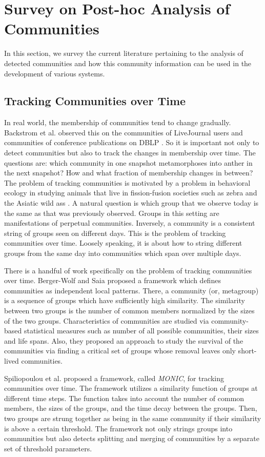 \section{Survey on Post-hoc Analysis of Communities}
In this section, we survey the current literature pertaining to the analysis of detected communities and how this community information can
be used in the development of various systems. 

\subsection{Tracking Communities over Time}
In real world, the membership of communities tend to change gradually. Backstrom et al. observed this on the communities of LiveJournal
users
and communities of conference publications on DBLP \cite{Backstrom:2006}. So it is important not only to detect communities but also to
track the changes in membership over time. The questions are: which community in one snapshot metamorphoses into anther in the next
snapshot? How and what fraction of membership changes in between? The problem of tracking communities is
motivated by a problem in behavioral ecology in studying animals that live in fission-fusion societies such as zebra and the Asiatic wild
ass \cite{citeulike:938243}. A natural question is
which group that we observe today is the same as that was previously observed. Groups in this setting are manifestations of perpetual
communities. Inversely, a community is a consistent string of groups seen on different days. This is the problem of tracking communities
over time. Loosely speaking, it is about how to string different groups from the same day into communities which span over multiple days. 

There is a handful of work specifically on the problem of tracking communities over time. Berger-Wolf and Saia \cite{Berger-Wolf:2006}
proposed a framework which defines communities as independent local patterns. There, a community (or, metagroup) is a sequence of groups
which have sufficiently high similarity. The similarity between two groups is the number of common members normalized by the sizes of the
two groups. Characteristics of communities are studied via community-based statistical measures such as number of all possible communities,
their sizes and life spans. Also, they proposed an approach to study the survival of the communities via finding a critical set of groups
whose removal leaves only short-lived communities.

Spiliopoulou et al. \cite{Spiliopoulou:2006} proposed a framework, called {\em MONIC}, for tracking communities over time. The framework
utilizes a similarity function of groups at different time steps. The function takes into account the number of common members, the sizes of
the groups, and the time decay between the groups. Then, two groups are strung together as being in the same community if their similarity
is above a certain threshold. The framework not only strings groups into communities but also detects splitting and merging of communities
by a separate set of threshold parameters. 

